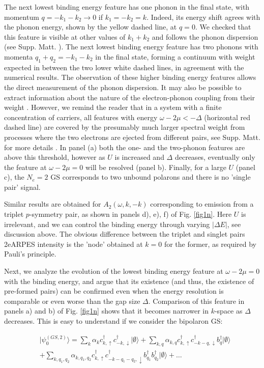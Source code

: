 \documentclass[prl,twocolumn,showpacs,amsmath,amssymb,superscriptaddress,floatfix]{revtex4}
\begin{document}
The next lowest binding energy feature has one phonon in the final state, with momentum $q=-k_1-k_2\rightarrow 0$ if $k_1=-k_2=k$. Indeed, its energy shift agrees with the phonon energy, shown by the yellow dashed line, at $q=0$. We checked that this feature is visible at other values of $k_1+k_2$ and follows the phonon dispersion (see Supp. Matt. \cite{SM}). The next lowest binding energy feature has two phonons with momenta $q_1+q_2=-k_1-k_2$ in the final state,  forming a continuum with weight expected in between the two lower white dashed lines, in agreement with the numerical results. The observation of these higher binding energy features allows the direct measurement of the phonon dispersion. It may also be possible to extract information about the  nature  of the electron-phonon coupling from their weight \cite{Krsnik2020}. However,  we remind the reader that in a system with a finite concentration of carriers, all features with energy $\omega-2\mu< -\Delta$ (horizontal red dashed line) are covered by the presumably much larger spectral weight from processes where the two electrons are ejected from different pairs, see Supp. Matt. for more details \cite{SM}.  In panel (a) both the one- and the two-phonon features are above this threshold, however as $U$ is increased and $\Delta $ decreases, eventually only the feature at $\omega - 2 \mu=0$ will be resolved (panel b). Finally, for a large $U$ (panel c), the $N_e=2$ GS corresponds to two unbound polarons and there is no  'single pair' signal.

Similar results are obtained for $A_2(\omega, k,-k)$ corresponding to emission from a triplet $p$-symmetry pair, as shown in panels d), e), f) of Fig. \ref{fig1n}. Here $U$ is irrelevant, and we can control the binding energy through varying $|\Delta E|$,  see discussion above. The obvious difference between the triplet and singlet pairs 2eARPES intensity is the 'node' obtained at $k=0$ for the former, as required by Pauli's principle.

Next, we analyze the evolution of the lowest binding energy feature at $\omega - 2 \mu=0$ with the binding energy, and argue that its existence (and thus, the existence of pre-formed pairs) can be confirmed even when the energy resolution is comparable or even worse than the gap size $\Delta$. Comparison of this feature in panels a) and b) of Fig. \ref{fig1n} shows that it becomes narrower in $k$-space as $\Delta $ decreases. This is easy to understand if we consider the bipolaron GS:

 \begin{align}
& \vert\psi_0^{(GS,2)}\rangle = \sum_k \alpha_k c^\dagger_{k,\uparrow}c^\dagger_{-k,\downarrow} \vert
   \emptyset\rangle + \sum_{k,q} \alpha_{k,q} c^\dagger_{k,\uparrow}c^\dagger_{-k-q,\downarrow} b^\dagger_q\vert  \emptyset\rangle \nonumber \\
  &  + \sum_{k,q_1,q_2} \alpha_{k,q_1,q_2} c^\dagger_{k,\uparrow}c^\dagger_{-k-q_1-q_2,\downarrow} b^\dagger_{q_1}b^\dagger_{q_2} \vert
\emptyset\rangle+ \dots\nonumber
\end{align}
\end{document}

